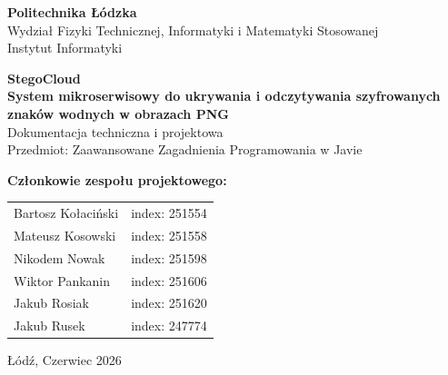 \documentclass[12pt,a4paper]{article}
\begin{document}
\begin{titlepage}
    \centering
    \vspace*{1cm}
    {\large\bfseries Politechnika Łódzka} \\
    \vspace*{0.2cm}
    {\large Wydział Fizyki Technicznej, Informatyki i Matematyki Stosowanej} \\
    \vspace*{0.2cm}
    {\large Instytut Informatyki} \\
    \vspace*{2cm}
    
    \vspace*{1.5cm}
    
    {\Huge\bfseries StegoCloud} \\
    \vspace*{0.5cm}
    {\Large\bfseries System mikroserwisowy do ukrywania i odczytywania szyfrowanych znaków wodnych w obrazach PNG} \\
    \vspace*{1cm}
    {\large Dokumentacja techniczna i projektowa} \\
    \vspace*{0.5cm}
    {\large Przedmiot: Zaawansowane Zagadnienia Programowania w Javie} \\
    \vspace*{2cm}
    
    \begin{flushleft}
        \large
        \textbf{Członkowie zespołu projektowego:} \\
        \vspace*{0.2cm}
        \begin{tabular}{ll}
            Bartosz Kołaciński & index: 251554 \\
            Mateusz Kosowski & index: 251558 \\
            Nikodem Nowak & index: 251598 \\
            Wiktor Pankanin & index: 251606 \\
            Jakub Rosiak & index: 251620 \\
            Jakub Rusek & index: 247774 \\
        \end{tabular}
    \end{flushleft}
    
    \vfill
    {\large Łódź, Czerwiec 2026}
\end{titlepage}
\end{document}
